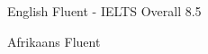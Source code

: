 
\begin{cvskills}
  \cvskill
    {English} %
    {Fluent - IELTS Overall 8.5} %

  \cvskill
    {Afrikaans} %
    {Fluent} %
\end{cvskills}
